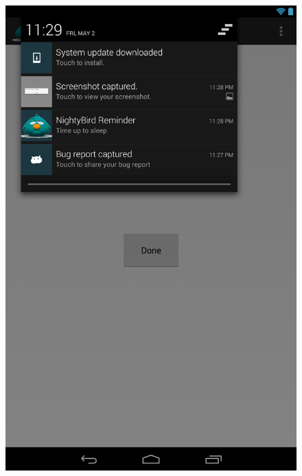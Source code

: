\documentclass[14pt]{extreport}
\begin{document}
\begin{figure}[h]
\begin{center}
\includegraphics[width=5in]{reminder}
\end{center}
\end{figure}
\end{document}
